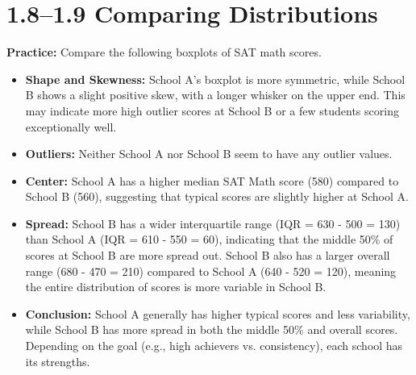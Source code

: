 \section*{1.8--1.9 Comparing Distributions}
\textbf{Practice:} Compare the following boxplots of SAT math scores.
\begin{center}
\end{center}
\bigskip
\begin{itemize}
    \item \textbf{Shape and Skewness:} School A's boxplot is more symmetric, while School B shows a slight positive skew, with a longer whisker on the upper end. This may indicate more high outlier scores at School B or a few students scoring exceptionally well.
    \item \textbf{Outliers:} Neither School A nor School B seem to have any outlier values.
    \item \textbf{Center:} School A has a higher median SAT Math score (580) compared to School B (560), suggesting that typical scores are slightly higher at School A.
    \item \textbf{Spread:} School B has a wider interquartile range (IQR = 630 - 500 = 130) than School A (IQR = 610 - 550 = 60), indicating that the middle 50\% of scores at School B are more spread out. School B also has a larger overall range (680 - 470 = 210) compared to School A (640 - 520 = 120), meaning the entire distribution of scores is more variable in School B.
    \item \textbf{Conclusion:} School A generally has higher typical scores and less variability, while School B has more spread in both the middle 50\% and overall scores. Depending on the goal (e.g., high achievers vs. consistency), each school has its strengths.
\end{itemize}


